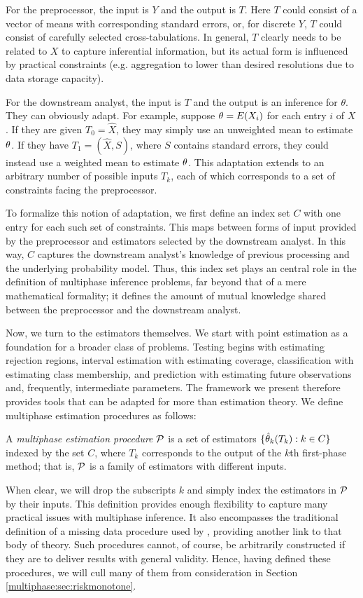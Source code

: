 For the preprocessor, the input  is $Y$ and the output is $T$.
 Here  $T$ could consist of a vector of means with corresponding standard errors, or,  for discrete $Y$, $T$ could consist of carefully selected cross-tabulations.
In general, $T$ clearly needs to be related to $X$ to capture inferential information, but its actual form is influenced by practical constraints (e.g. aggregation to lower than desired resolutions due to data storage capacity).

For the downstream analyst, the input is $T$ and the output is an inference for $\theta$. 
They can obviously adapt. 
For example, suppose $\theta = E(X_i)$ for each entry $i$ of $X$.
If they are given $T_0 = \hat{X}$, they may simply use an unweighted mean to estimate $\theta$.
If they have $T_1 = (\hat{X}, S)$, where $S$ contains standard errors, they could instead use a weighted mean to estimate $\theta$.
This adaptation extends to an arbitrary number of possible inputs $T_k$, each of which corresponds to a set of constraints facing the preprocessor.

To formalize this notion of adaptation, we first define an index set $C$ with one entry for each such set of constraints.
This maps between forms of input provided by the preprocessor and estimators selected by the downstream analyst.
In this way, $C$ captures the downstream analyst's knowledge of previous processing and the underlying probability model.
Thus, this index set plays an central role in the definition of multiphase inference problems, far beyond that of a mere mathematical formality; it defines the amount of mutual knowledge shared between the preprocessor and the downstream analyst.

Now, we turn to the estimators themselves.
We start with point estimation as a foundation for a broader class of problems.
Testing begins with estimating rejection regions, interval estimation with estimating coverage, classification with estimating class membership, and prediction with estimating future observations and, frequently, intermediate parameters.
The framework we present therefore provides tools that can be adapted for more than estimation theory.
We define multiphase estimation procedures as follows:
%
\begin{definition}
A \emph{multiphase estimation procedure} $\mathcal{P}$ is a set of estimators $\{\hat{\theta}_k(T_k) : k \in C \}$ indexed by the set $C$, where $T_k$ corresponds to the output of the $k$th first-phase method; that is, $\mathcal{P}$ is a family of estimators with different inputs.
\end{definition}
%
When clear, we will drop the subscripts $k$ and simply index the estimators in $\mathcal{P}$ by their inputs.
This definition provides enough flexibility to capture many practical issues with multiphase inference.
It also encompasses the traditional definition of a missing data procedure used by \citet{Meng1994}, providing another link to that body of theory.
Such procedures cannot, of course, be arbitrarily constructed if they are to deliver results with general validity.
Hence, having defined these procedures, we will cull many of them from consideration in Section \ref{multiphase:sec:riskmonotone}.

